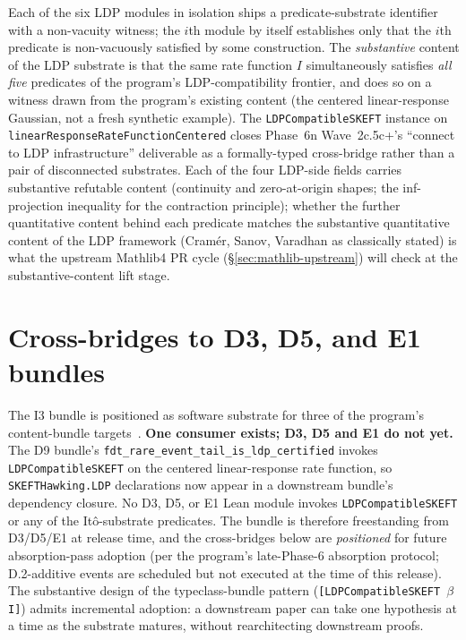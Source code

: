 \documentclass[11pt]{article}
\begin{document}
Each of the six LDP modules in isolation ships a predicate-substrate
identifier with a non-vacuity witness; the $i$th module by itself
establishes only that the $i$th predicate is non-vacuously satisfied
by some construction. The \emph{substantive} content of the LDP
substrate is that the same rate function $I$ simultaneously satisfies
\emph{all five} predicates of the program's LDP-compatibility frontier,
and does so on a witness drawn from the program's existing
content (the centered linear-response Gaussian, not a fresh
synthetic example). The \texttt{LDPCompatibleSKEFT} instance on
\texttt{linearResponseRateFunctionCentered} closes Phase~6n
Wave~2c.5c+'s ``connect to LDP infrastructure'' deliverable as a
formally-typed cross-bridge rather than a pair of disconnected
substrates. Each of the four LDP-side fields carries substantive
refutable content (continuity and zero-at-origin shapes; the
inf-projection inequality for the contraction principle); whether
the further quantitative content behind each predicate matches the
substantive quantitative content of the LDP framework (Cram\'er,
Sanov, Varadhan as classically stated) is what the upstream
Mathlib4 PR cycle (\S\ref{sec:mathlib-upstream}) will check at the
substantive-content lift stage.


\section{Cross-bridges to D3, D5, and E1 bundles}
\label{sec:cross-bridges}

The I3 bundle is positioned as software substrate for three of the
program's content-bundle targets~\cite{Roehm2026Strategy}. \textbf{One
consumer exists; D3, D5 and E1 do not yet.} The D9 bundle's
\texttt{fdt\_rare\_event\_tail\_is\_ldp\_certified} invokes
\texttt{LDPCompatibleSKEFT} on the centered linear-response rate function,
so \texttt{SKEFTHawking.LDP} declarations now appear in a downstream
bundle's dependency closure. No D3, D5, or E1 Lean module invokes
\texttt{LDPCompatibleSKEFT} or any of the It\^o-substrate
predicates. The bundle is therefore freestanding from D3/D5/E1 at
release time, and the cross-bridges below are \emph{positioned} for
future absorption-pass adoption (per the program's late-Phase-6
absorption protocol; D.2-additive events are scheduled but not
executed at the time of this release). The
substantive design of the typeclass-bundle pattern
(\texttt{[LDPCompatibleSKEFT $\beta$ I]}) admits incremental adoption:
a downstream paper can take one hypothesis at a time as the substrate
matures, without rearchitecting downstream proofs.
\end{document}
